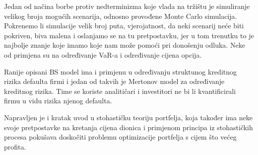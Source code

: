 \documentclass[times, utf8, seminar]{fer}
\begin{document}
Jedan od načina borbe protiv nedterminizma koje vlada na tržištu je simuliranje velikog broja mogućih scenarija, odnosno provođene Monte Carlo simulacija. Pokrenemo li simulacije velik broj puta, vjerojatnost, da neki scenarij neće biti pokriven, biva malena i oslanjamo se na tu pretpostavku, jer u tom trenutku to je najbolje znanje koje imamo koje nam može pomoći pri donošenju odluka. Neke od primjena su na određivanje VaR-a i određivanje cijena opcija.

Ranije opisani BS model ima i primjenu u određivanju struktunog kreditnog rizika defaulta firmi i jedan od takvih je Mertonov model za određivanje kreditnog rizika. Time se koriste analitičari i investitori ne bi li kvantificirali firmu u vidu rizika njenog defaulta.

Napravljen je i kratak uvod u stohastičku teoriju portfelja, koja također ima neke svoje pretpostavke na kretanja cijena dionica i primjenom principa iz stohastičkih procesa pokušava doskočiti problemu optimizacije portfelja s cijem što većeg profita.
\end{document}
